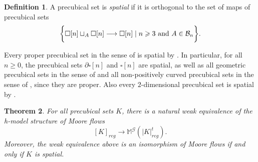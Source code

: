 \documentclass[a4paper,12pt]{amsart}
\newcommand{\de}{\partial}
\newtheorem{thm}{Theorem}[section]
\newcommand{\bth}{\begin{thm}}
\renewcommand{\eth}{\end{thm}}
\theoremstyle{definition}
\newtheorem{defn}[thm]{Definition}
\newcommand{\bd}{\begin{defn}}
\newcommand{\ed}{\end{defn}}
\renewcommand{\geq}{\geqslant}
\newcommand{\moore}{{\mathbb{M}}}
\begin{document}
\bd \label{carac_spatial}
A precubical set is \textit{spatial} if it is orthogonal to the set of maps of precubical sets 
\[\bigg\{\square[n]\sqcup_A \square[n]\longrightarrow \square[n]\mid n\geq 3 \hbox{ and }A\in \mathcal{B}_n\bigg\}.\]
\ed

Every proper precubical set in the sense of \cite[page~499]{MR3722069} is spatial by \cite[Proposition~7.5]{NaturalRealization}. In particular, for all $n\geq 0$, the precubical sets $\de\square[n]$ and $\square[n]$ are spatial, as well as all geometric precubical sets in the sense of \cite[Definition~1.18]{zbMATH07226006} and all non-positively curved precubical sets in the sense of \cite[Definition~1.28]{zbMATH07226006}, since they are proper. Also every $2$-dimensional precubical set is spatial by \cite[Corollary~A.3]{NaturalRealization}. 



\bth \label{iso_reg_reg0} 
For all precubical sets $K$, there is a natural weak equivalence of the h-model structure of Moore flows \[[K]_{reg} \longrightarrow \moore^{\mathcal{G}}(|K|^t_{reg}).\] Moreover, the weak equivalence above is an isomorphism of Moore flows if and only if $K$ is spatial.
\eth
\end{document}
